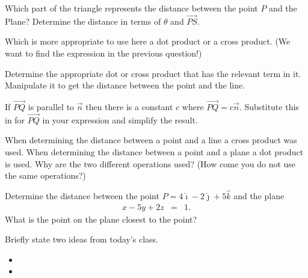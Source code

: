 \begin{problem}
\begin{subproblem}
    \item Which part of the triangle represents the distance between the point $P$ and the Plane?
       Determine the distance in terms of $\theta$ and $\overrightarrow{PS}$.
      \vfill

    \item Which is more appropriate to use here a dot product or a cross product. (We want to find the expression in the previous question!)
      \vspace{3em}

    \item Determine the appropriate dot or cross product that has the relevant term in it. Manipulate it to get the distance between the point and the line.
      \vfill

    \item If $\overrightarrow{PQ}$ is parallel to $\vec{n}$ then there is a constant $c$ where $\overrightarrow{PQ}=c\vec{n}$.
      Substitute this in for $\overrightarrow{PQ}$ in your expression and simplify the result.

      \vfill
  \end{subproblem}
  \clearpage

  \item When determining the distance between a point and a line a cross product was used.
    When determining the distance between a point and a plane a dot product is used. Why are the two different operations used? (How come you do not use the same operations?)
    \vspace{4em}

  \item Determine the distance between the point $P=4\hat{\imath} - 2\hat{\jmath} + 5\hat{k}$ and the plane
  \begin{eqnarray*}
    x - 5y + 2z & = & 1.
  \end{eqnarray*}
  What is the point on the plane closest to the point?
  \vfill

\end{problem}


\postClass

\begin{problem}
\item Briefly state two ideas from today's class.
  \begin{itemize}
  \item
  \item
  \end{itemize}
\item
  \begin{subproblem}
    \item
  \end{subproblem}
\end{problem}


